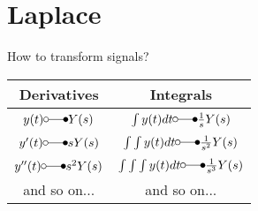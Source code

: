 \section{Laplace}

How to transform signals?

\begin{tabular}{c|c}
	Derivatives  & Integrals  \\ \hline
	\(y(t) \laplace Y(s)\) 						&  \(\int y(t) dt \laplace \frac{1}{s} Y(s)\) \\
	\(y^\prime (t) \laplace s Y(s)\)				&  \(\int\int y(t) dt \laplace \frac{1}{s^2} Y(s) \)  \\ 
	\(y^{\prime\prime} (t) \laplace s^2 Y(s)\)  	&  \(\int\int\int y(t) dt \laplace \frac{1}{s^3} Y(s)\) \\
	and so on... & and so on...
\end{tabular} 